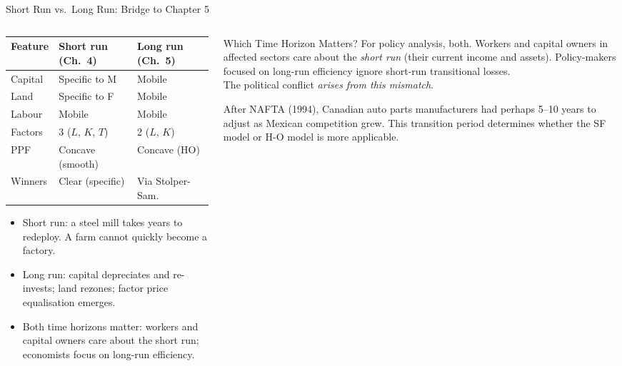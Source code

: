 \documentclass[aspectratio=169]{beamer}
\begin{document}
\begin{frame}[shrink=12]{Short Run vs.\ Long Run: Bridge to Chapter 5}
\begin{columns}[T]
\begin{column}{0.53\textwidth}
\begin{adjustbox}{max width=\columnwidth}
\begin{tabular}{lll}
\toprule
\textbf{Feature} & \textbf{Short run (Ch.~4)} &
\textbf{Long run (Ch.~5)}\\
\midrule
Capital & Specific to M & Mobile\\
Land   & Specific to F & Mobile\\
Labour & Mobile & Mobile\\
Factors & 3 ($L$, $K$, $T$) & 2 ($L$, $K$)\\
PPF & Concave (smooth) & Concave (HO)\\
Winners & Clear (specific) & Via Stolper-Sam.\\
\bottomrule
\end{tabular}
\end{adjustbox}
\vspace{0.3em}
\begin{itemize}\small
  \item Short run: a steel mill takes years to redeploy.
        A farm cannot quickly become a factory.
  \item Long run: capital depreciates and re-invests;
        land rezones; factor price equalisation emerges.
  \item Both time horizons matter: workers and capital
        owners care about the short run; economists focus
        on long-run efficiency.
\end{itemize}
\end{column}
\begin{column}{0.44\textwidth}
\begin{insight}{Which Time Horizon Matters?}
\small For policy analysis, both.  Workers and capital
owners in affected sectors care about the \emph{short
run} (their current income and assets).  Policy-makers
focused on long-run efficiency ignore short-run
transitional losses.\\[0.2em]
The political conflict \emph{arises from this mismatch}.
\end{insight}
\vspace{0.3em}
\begin{canadex}
\footnotesize After NAFTA (1994), Canadian auto parts
manufacturers had perhaps 5--10 years to adjust as
Mexican competition grew.  This transition period
determines whether the SF model or H-O model is more
applicable.
\end{canadex}
\end{column}
\end{columns}
\end{frame}
\end{document}
